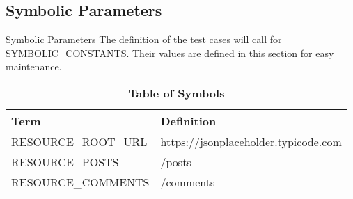 \subsection{Symbolic Parameters} \label{app:symb}{Symbolic Parameters}
The definition of the test cases will call for SYMBOLIC\_CONSTANTS.
Their values are defined in this section for easy maintenance.
\begin{table}[!htbp]
	\fontsize{9pt}{5pt}\selectfont
	\begin{tabularx}{\textwidth}{p{4cm}X}
		\toprule
		\textbf{Term} & \textbf{Definition}\\
		\midrule
		RESOURCE\_ROOT\_URL & https://jsonplaceholder.typicode.com\\
		RESOURCE\_POSTS & /posts \\
		RESOURCE\_COMMENTS & /comments \\
		\bottomrule
	\end{tabularx}
	\caption{\textbf{Table of Symbols}} \label{Table:symbols}
\end{table}	



